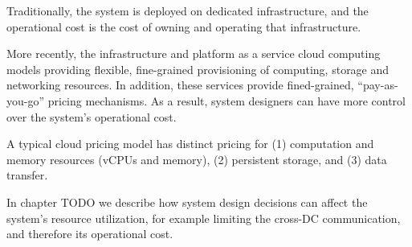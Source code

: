 Traditionally, the system is deployed on dedicated infrastructure, and the operational cost is the cost of owning and
operating that infrastructure.

More recently, the infrastructure and platform as a service cloud computing models providing flexible, fine-grained
provisioning of computing, storage and networking resources.
In addition, these services provide fined-grained, ``pay-as-you-go'' pricing mechanisms.
As a result, system designers can have more control over the system's operational cost.

A typical cloud pricing model \cite{aws:pricing} has distinct pricing for (1) computation and memory resources
(vCPUs and memory), (2) persistent storage, and (3) data transfer.

In chapter
TODO
we describe how system design decisions can affect the system's resource utilization, for example limiting the cross-DC
communication, and therefore its operational cost.


